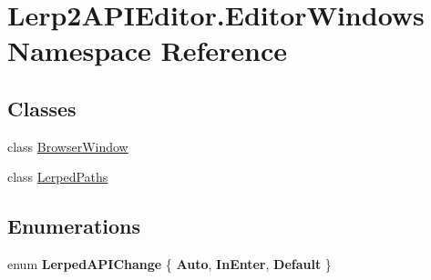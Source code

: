 \hypertarget{namespace_lerp2_a_p_i_editor_1_1_editor_windows}{}\section{Lerp2\+A\+P\+I\+Editor.\+Editor\+Windows Namespace Reference}
\label{namespace_lerp2_a_p_i_editor_1_1_editor_windows}
\subsection*{Classes}
\begin{DoxyCompactItemize}
\item 
class \hyperlink{class_lerp2_a_p_i_editor_1_1_editor_windows_1_1_browser_window}{Browser\+Window}
\item 
class \hyperlink{class_lerp2_a_p_i_editor_1_1_editor_windows_1_1_lerped_paths}{Lerped\+Paths}
\end{DoxyCompactItemize}
\subsection*{Enumerations}
\begin{DoxyCompactItemize}
\item 
\mbox{\label{namespace_lerp2_a_p_i_editor_1_1_editor_windows_a7ebc015ae3bb1313ff6c2ba392ffe72c}} 
enum {\bfseries Lerped\+A\+P\+I\+Change} \{ {\bfseries Auto}, 
{\bfseries In\+Enter}, 
{\bfseries Default}
 \}
\end{DoxyCompactItemize}

